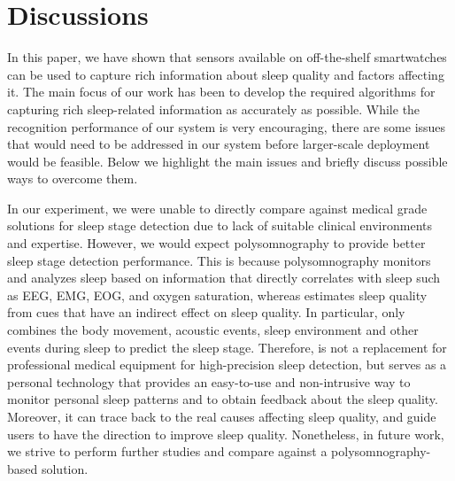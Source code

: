 \section{Discussions}\label{sec:discussion}

In this paper, we have shown that sensors available on off-the-shelf smartwatches can be used to capture rich information about sleep quality and factors affecting it. The main focus of our work has been to develop the required algorithms for capturing rich sleep-related information as accurately as possible. While the recognition performance of our system is very encouraging, there are some issues that would need to be addressed in our system before larger-scale deployment would be feasible. Below we highlight the main issues and briefly discuss possible ways to overcome them.


 {In our experiment, we were unable to directly compare {\systemname} against medical
grade solutions for sleep stage detection due to lack of suitable clinical environments and expertise.} However, we would expect
polysomnography to provide better sleep stage detection performance. This is because polysomnography monitors and analyzes sleep based on
information that directly correlates with sleep such as EEG, EMG, EOG, and oxygen saturation, whereas {\systemname} estimates sleep quality
from cues that have an indirect effect on sleep quality. In particular, {\systemname} only combines the body movement, acoustic events,
sleep environment and other events during sleep to predict the sleep stage. Therefore, {\systemname} is not a replacement for professional
medical equipment for high-precision sleep detection, but serves as a personal technology that provides an easy-to-use and non-intrusive
way to monitor personal sleep patterns and to obtain feedback about the sleep quality. Moreover, it can trace back to the real causes
affecting sleep quality, and guide users to have the direction to improve sleep quality. Nonetheless, in future work, we strive to perform
further studies and compare {\systemname} against a polysomnography-based solution.

